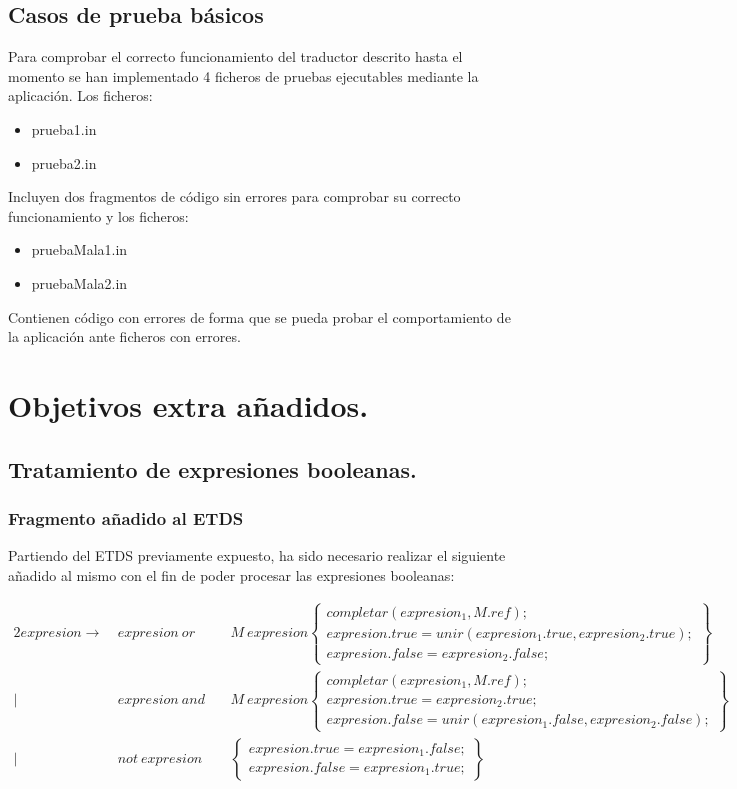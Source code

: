 \documentclass[12pt,a4paper, landscape]{article}
\theoremstyle{mytheor}
\begin{document}
\subsection{Casos de prueba básicos}
Para comprobar el correcto funcionamiento del traductor descrito hasta el momento se han implementado 4 ficheros de pruebas ejecutables mediante la aplicación. Los ficheros:
\begin{itemize}
\item prueba1.in
\item prueba2.in
\end{itemize}
Incluyen dos fragmentos de código sin errores para comprobar su correcto funcionamiento y los ficheros:
\begin{itemize}
\item pruebaMala1.in
\item pruebaMala2.in
\end{itemize}
Contienen código con errores de forma que se pueda probar el comportamiento de la aplicación ante ficheros con errores.


\section{Objetivos extra añadidos.}
\subsection{Tratamiento de expresiones booleanas.}
\subsubsection{Fragmento añadido al ETDS}
Partiendo del ETDS previamente expuesto, ha sido necesario realizar el siguiente añadido al mismo con el fin de poder procesar las expresiones booleanas:
\begin{center}
     \begin{alignat*}{2}
      expresion \to\ &  expresion\ or && M\ expresion \begin{Bmatrix} completar(expresion_1, M.ref);\\ expresion.true=unir(expresion_1.true, expresion_2.true); \\  expresion.false=expresion_2.false;\end{Bmatrix} \\
      |\ & expresion\ and\ && M\ expresion  \begin{Bmatrix} completar(expresion_1, M.ref);\\ expresion.true=expresion_2.true; \\  expresion.false=unir(expresion_1.false, expresion_2.false);\end{Bmatrix}\\
      |\ & not\ expresion && \begin{Bmatrix} expresion.true=expresion_1.false; \\  expresion.false=expresion_1.true;\end{Bmatrix}
      \end{alignat*}
\end{center}
\end{document}
